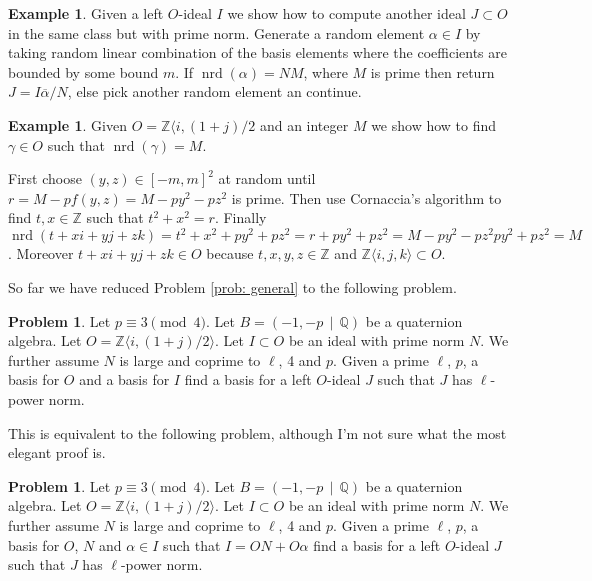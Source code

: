 \documentclass[10pt]{article}
\theoremstyle{plain}
\theoremstyle{definition}
\newtheorem{example}[theorem]{Example}
\newtheorem{problem}[theorem]{Problem}
\newcommand{\op}{\operatorname}
\newcommand{\Z}{\mathbb{Z}}
\newcommand{\Q}{\mathbb{Q}}
\newcommand{\nrd}{\op{nrd}}
\begin{document}
\begin{example}
    Given a left \( O \)-ideal \( I \) we show how to compute another ideal \( J \subset O \) in the same class but with prime norm.
    Generate a random element \( \alpha \in I \) by taking random linear combination of the basis elements where the coefficients are bounded by some bound \( m \).
    If \( \nrd(\alpha) = NM \), where \( M \) is prime then return \( J = I \overline{\alpha} / N \), else pick another random element an continue.
\end{example}


\begin{example}
    Given \( O = \Z \langle i, (1+j) / 2 \) and an integer \( M \) we show how to find \( \gamma \in O \) such that \( \nrd(\gamma) = M \).

    First choose \( (y, z) \in [-m , m]^2 \) at random until \( r = M - pf(y, z) = M - py^2 - pz^2\) is prime.
    Then use Cornaccia's algorithm to find \( t, x \in \Z \) such that \(  t^2 + x^2 = r.\)
    Finally \( \nrd(t + xi + yj + zk) = t^2 + x^2 + py^2 + pz^2 = r + py^2 + pz^2 = M - py^2 - pz^2 py^2 + pz^2 = M\).
    Moreover \( t + xi + yj + zk \in O \) because \( t, x, y, z \in \Z \) and \( \Z \langle i ,j, k \rangle \subset O \).
\end{example}


So far we have reduced Problem \ref{prob: general} to the following problem.
\begin{problem} \label{prob: prime norm}
Let \( p \equiv 3 \pmod{4} \).
Let \( B =  (-1, -p \, \mid \, \Q) \) be a quaternion algebra.
Let \( O = \Z \langle i, (1+j) / 2 \rangle \).
Let \( I \subset O \) be an ideal with prime norm \( N \).
We further assume \( N \) is large and coprime to \( \ell \), 4 and \( p \).
Given a prime \( \ell \), \( p \), a basis for \( O \) and a basis for \( I \) find a basis for a left \( O \)-ideal \( J \) such that \( J \) has \( \ell \)-power norm.
\end{problem}

This is equivalent to the following problem, although I'm not sure what the most elegant proof is.
\begin{problem} \label{prob: prime norm}
Let \( p \equiv 3 \pmod{4} \).
Let \( B =  (-1, -p \, \mid \, \Q) \) be a quaternion algebra.
Let \( O = \Z \langle i, (1+j) / 2 \rangle \).
Let \( I \subset O \) be an ideal with prime norm \( N \).
We further assume \( N \) is large and coprime to \( \ell \), 4 and \( p \).
Given a prime \( \ell \), \( p \), a basis for \( O \), \( N \) and \( \alpha \in I \) such that \( I = ON + O\alpha \) find a basis for a left \( O \)-ideal \( J \) such that \( J \) has \( \ell \)-power norm.
\end{problem}
\end{document}
